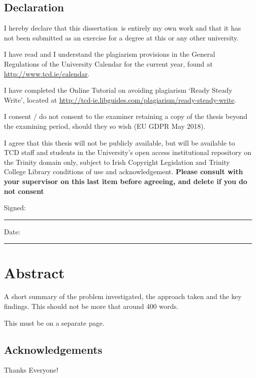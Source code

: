 \documentclass[a4paper,oneside,12pt]{book}
\title{\thesistitle}
\author{\authorname}
\newcommand{\typeofthesis}{dissertation} %
\numberwithin{equation}{chapter} %
\begin{document}

\section*{\Huge\textcolor{tcd_blue}{Declaration}}
\vspace{1cm}
I hereby declare that this \typeofthesis\ is entirely my own work and that it has not been submitted as an exercise for a degree at this or any other university.

\vspace{1cm}
I have read and I understand the plagiarism provisions in the General Regulations of the University Calendar for the current year, found at \url{http://www.tcd.ie/calendar}.
\vspace{1cm}

I have completed the Online Tutorial on avoiding plagiarism `Ready Steady Write', located at \url{http://tcd-ie.libguides.com/plagiarism/ready-steady-write}.
\vspace{1cm}

I consent / do not consent to the examiner retaining a copy of the thesis beyond the examining period, should they so wish (EU GDPR May 2018).
\vspace{1cm}

I agree that this thesis will not be publicly available, but will be available to TCD staff and students in the University’s open access institutional repository on the Trinity domain only, subject to Irish Copyright Legislation and Trinity College Library conditions of use and acknowledgement.  \textbf{Please consult with your supervisor on this last item before agreeing, and delete if you do not consent}
\vspace{3cm}

Signed:~\rule{5cm}{0.3pt}\hfill Date:~\rule{5cm}{0.3pt}

\chapter*{Abstract}
A short summary of the problem investigated, the approach taken and the key findings. This should not be more that around 400 words.


This must be on a separate page.


\newpage
\onehalfspacing\raggedright %

\section*{\Huge\textcolor{tcd_blue}{Acknowledgements}}
Thanks Everyone!
\end{document}
